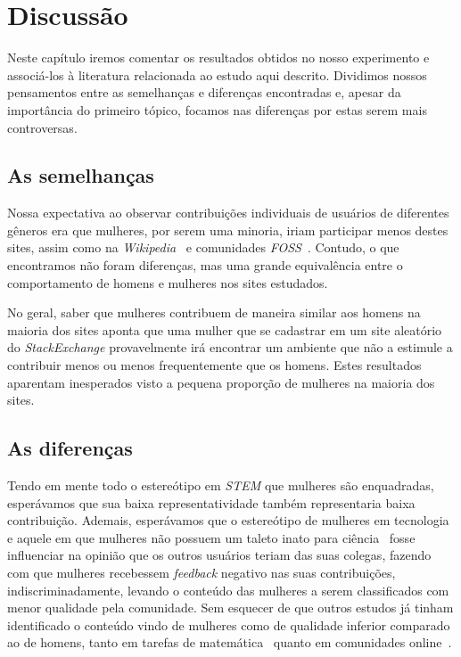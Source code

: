 \chapter{Discussão}
\label{ch:discussao}

Neste capítulo iremos comentar os resultados obtidos no nosso experimento e associá-los à literatura relacionada ao estudo aqui descrito. Dividimos nossos pensamentos entre as semelhanças e diferenças encontradas e, apesar da importância do primeiro tópico, focamos nas diferenças por estas serem mais controversas.

\section{As semelhanças}

Nossa expectativa ao observar contribuições individuais de usuários de diferentes gêneros era que mulheres, por serem uma minoria, iriam participar menos destes sites, assim como na \emph{Wikipedia}~\cite{antin2011gender} e comunidades \emph{FOSS}~\cite{rustad2011suck}. Contudo, o que encontramos não foram diferenças, mas uma grande equivalência entre o comportamento de homens e mulheres nos sites estudados. 

No geral, saber que mulheres contribuem de maneira similar aos homens na maioria dos sites aponta que uma mulher que se cadastrar em um site aleatório do \emph{StackExchange} provavelmente irá encontrar um ambiente que não a estimule a contribuir menos ou menos frequentemente que os homens. Estes resultados aparentam inesperados visto a pequena proporção de mulheres na maioria dos sites.

\section{As diferenças}

Tendo em mente todo o estereótipo em \emph{STEM} que mulheres são enquadradas, esperávamos que sua baixa representatividade também representaria baixa contribuição. Ademais, esperávamos que o estereótipo de mulheres em tecnologia~\cite{hyde1990gender} e aquele em que mulheres não possuem um taleto inato para ciência~\cite{leslie2015expectations} fosse influenciar na opinião que os outros usuários teriam das suas colegas, fazendo com que mulheres recebessem \emph{feedback} negativo nas suas contribuições, indiscriminadamente, levando o conteúdo das mulheres a serem classificados com menor qualidade pela comunidade. Sem esquecer de que outros estudos já tinham identificado o conteúdo vindo de mulheres como de qualidade inferior comparado ao de homens, tanto em tarefas de matemática~\cite{campbell1986effects} quanto em comunidades online~\cite{collier2012conflict}.

